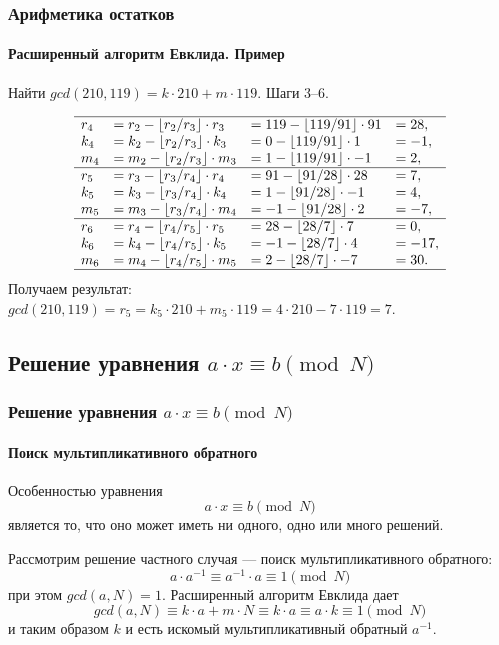 \begin{frame}
    \frametitle{Арифметика остатков}
    \framesubtitle{Расширенный алгоритм Евклида. Пример}
    
    Найти $gcd(210, 119)=k\cdot 210 + m\cdot 119$. Шаги 3--6.
    
    \[
        \begin{array}[c]{llll}
        \hline
        r_4&=r_{2} - \lfloor r_{2}/r_{3}\rfloor\cdot r_{3}&=119-\lfloor 119/91\rfloor\cdot 91&=28,\\
        k_4&=k_{2}-\lfloor r_{2}/r_{3}\rfloor\cdot k_{3}&=0-\lfloor 119/91\rfloor\cdot 1&=-1,\\
        m_4&=m_{2}-\lfloor r_{2}/r_{3}\rfloor\cdot m_{3}&=1-\lfloor 119/91\rfloor\cdot -1&=2,\\
        \hline
        r_5&=r_{3} - \lfloor r_{3}/r_{4}\rfloor\cdot r_{4}&=91-\lfloor 91/28\rfloor\cdot 28&=7,\\
        k_5&=k_{3}-\lfloor r_{3}/r_{4}\rfloor\cdot k_{4}&=1-\lfloor 91/28\rfloor\cdot -1&=4,\\
        m_5&=m_{3}-\lfloor r_{3}/r_{4}\rfloor\cdot m_{4}&=-1-\lfloor 91/28\rfloor\cdot 2&=-7,\\
        \hline
        r_6&=r_{4} - \lfloor r_{4}/r_{5}\rfloor\cdot r_{5}&=28-\lfloor 28/7\rfloor\cdot 7&=0,\\
        k_6&=k_{4}-\lfloor r_{4}/r_{5}\rfloor\cdot k_{5}&=-1-\lfloor 28/7\rfloor\cdot 4&=-17,\\
        m_6&=m_{4}-\lfloor r_{4}/r_{5}\rfloor\cdot m_{5}&=2-\lfloor 28/7\rfloor\cdot -7&=30.\\
        \hline
        \end{array}
    \]
    Получаем результат: $gcd(210, 119)=r_5=k_5\cdot 210 + m_5\cdot 119=4\cdot 210 - 7\cdot 119 = 7.$
\end{frame}


\subsection{Решение уравнения $a\cdot x \equiv b\pmod{N}$}

\begin{frame}
    \frametitle{Решение уравнения $a\cdot x \equiv b\pmod{N}$}
    \framesubtitle{Поиск мультипликативного обратного}
    
    Особенностью уравнения 
    \begin{equation} \label{eq:linearCommon}
        a\cdot x \equiv b\pmod{N}
    \end{equation}
    является то, что оно может иметь ни одного, одно или много решений.

    Рассмотрим решение частного случая --- поиск \alert{мультипликативного обратного}:
    \begin{equation}\label{eq:multiplicativeReversy}
        a\cdot a^{-1} \equiv a^{-1}\cdot a\equiv 1\pmod{N}
    \end{equation}
    при этом $gcd(a, N)=1$. Расширенный алгоритм Евклида дает
    \[gcd(a, N)\equiv k\cdot a + m\cdot N\equiv k\cdot a \equiv a\cdot k \equiv 1 \pmod{N}\]
    и таким образом $k$ и есть искомый \alert{мультипликативный обратный} $a^{-1}$.
\end{frame}

